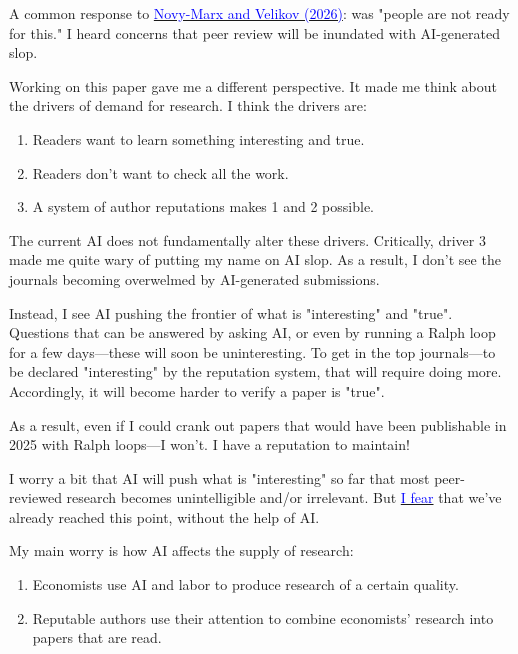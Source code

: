 \documentclass[12pt]{article}
\begin{document}
\begin{mdframed}[
linewidth=1pt,
linecolor=black,
innerleftmargin=0.25em,
innerrightmargin=0.25em,
innertopmargin=0.2\baselineskip,
innerbottommargin=0.8\baselineskip
]
A common response to \href{https://www.aeaweb.org/articles?id=10.1257/jel.20251821}{\textcolor{blue}{Novy-Marx and Velikov (2026)}}: was "people are not ready for this." I heard concerns that peer review will be inundated with AI-generated slop.

Working on this paper gave me a different perspective. It made me think about the drivers of demand for research. I think the drivers are:

\vspace{-2ex}
\begin{enumerate}
\setlength{\itemsep}{0.15em}
\setlength{\parskip}{0pt}
\item Readers want to learn something interesting and true.
\item Readers don't want to check all the work.
\item A system of author reputations makes 1 and 2 possible.
\end{enumerate}
\vspace{-2ex}

The current AI does not fundamentally alter these drivers. Critically, driver 3 made me quite wary of putting my name on AI slop. As a result, I don't see  the journals becoming overwelmed by AI-generated submissions.

Instead, I see AI pushing the frontier of what is "interesting" and "true".  Questions that can be answered by asking AI, or even by running a Ralph loop for a few days---these will soon be uninteresting. To get in the top journals---to be declared "interesting" by the reputation system, that will require doing more. Accordingly, it will become harder to verify a paper is "true".

As a result, even if I could crank out papers that would have been publishable in 2025 with Ralph loops---I won't. I have a reputation to maintain!

I worry a bit that AI will push what is "interesting" so far that most peer-reviewed research becomes unintelligible and/or irrelevant. But \href{https://arxiv.org/pdf/2212.10317}{\textcolor{blue}{I fear}} that we've already reached this point, without the help of AI.

My main worry is how AI affects the supply of research:

\vspace{-2ex}
\begin{enumerate}
\setlength{\itemsep}{0.15em}
\setlength{\parskip}{0pt}
\item Economists use AI and labor to produce research of a certain quality. 
\item Reputable authors use their attention to combine economists' research into papers that are read.
\end{enumerate}
\vspace{-2ex}


\end{mdframed}
\end{document}
